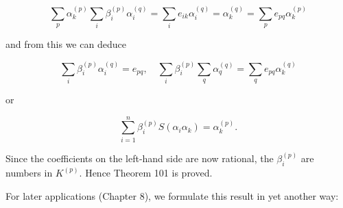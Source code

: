 $$\sum_p \alpha_k^{(p)} \sum_i \beta_i^{(p)} \alpha_i^{(q)} = \sum_i e_{ik} \alpha_i^{(q)} = \alpha_k^{(q)} = \sum_p e_{pq} \alpha_k^{(p)}$$

and from this we can deduce

$$\sum_i \beta_i^{(p)} \alpha_i^{(q)} = e_{pq}, \quad \sum_i \beta_i^{(p)} \sum_q \alpha_q^{(q)} = \sum_q e_{pq} \alpha_k^{(q)}$$

or

$$\sum_{i=1}^{n} \beta_i^{(p)} S(\alpha_i \alpha_k) = \alpha_k^{(p)}.$$

Since the coefficients on the left-hand side are now rational, the $\beta_i^{(p)}$ are numbers in $K^{(p)}$. Hence Theorem 101 is proved.

For later applications (Chapter 8), we formulate this result in yet another way:
